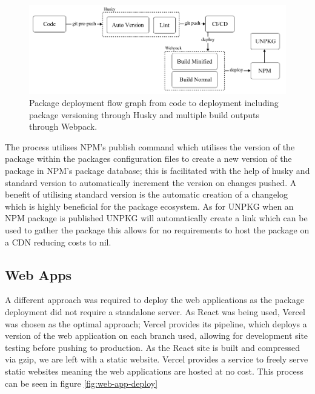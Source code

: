 \documentclass{l4proj}
\begin{document}
\begin{figure}[H]
    \begin{center}
    \includegraphics[width=14cm]{dissertation/images/Deployment.png}
    \end{center}
    \caption{Package deployment flow graph from code to deployment including package versioning through Husky and multiple build outputs through Webpack.}
    \label{fig:deployment}
\end{figure}

The process utilises NPM's publish command which utilises the version of the package within the packages configuration files to create a new version of the package in NPM's package database; this is facilitated with the help of husky and standard version to automatically increment the version on changes pushed. A benefit of utilising standard version is the automatic creation of a changelog which is highly beneficial for the package ecosystem. As for UNPKG when an NPM package is published UNPKG will automatically create a link which can be used to gather the package this allows for no requirements to host the package on a CDN reducing costs to nil.

\subsection{Web Apps}
A different approach was required to deploy the web applications as the package deployment did not require a standalone server. As React was being used, Vercel was chosen as the optimal approach; Vercel provides its pipeline, which deploys a version of the web application on each branch used, allowing for development site testing before pushing to production. As the React site is built and compressed via gzip, we are left with a static website. Vercel provides a service to freely serve static websites meaning the web applications are hosted at no cost. This process can be seen in figure \ref{fig:web-app-deploy}
\end{document}
